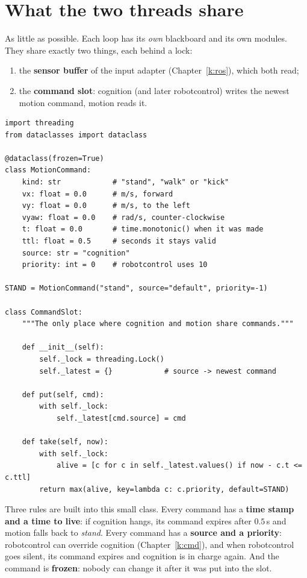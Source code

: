 \section*{What the two threads share}
As little as possible. Each loop has its \emph{own} blackboard and its own modules. They share exactly two things, each behind a lock:
\begin{enumerate}[nosep]
  \item the \textbf{sensor buffer} of the input adapter (Chapter~\ref{k:ros}), which both read;
  \item the \textbf{command slot}: cognition (and later robotcontrol) writes the newest motion command, motion reads it.
\end{enumerate}
\begin{verbatim}
import threading
from dataclasses import dataclass

@dataclass(frozen=True)
class MotionCommand:
    kind: str            # "stand", "walk" or "kick"
    vx: float = 0.0      # m/s, forward
    vy: float = 0.0      # m/s, to the left
    vyaw: float = 0.0    # rad/s, counter-clockwise
    t: float = 0.0       # time.monotonic() when it was made
    ttl: float = 0.5     # seconds it stays valid
    source: str = "cognition"
    priority: int = 0    # robotcontrol uses 10

STAND = MotionCommand("stand", source="default", priority=-1)

class CommandSlot:
    """The only place where cognition and motion share commands."""

    def __init__(self):
        self._lock = threading.Lock()
        self._latest = {}            # source -> newest command

    def put(self, cmd):
        with self._lock:
            self._latest[cmd.source] = cmd

    def take(self, now):
        with self._lock:
            alive = [c for c in self._latest.values() if now - c.t <= c.ttl]
        return max(alive, key=lambda c: c.priority, default=STAND)
\end{verbatim}
Three rules are built into this small class. Every command has a \textbf{time stamp and a time to live}: if cognition hangs, its command expires after $0.5$\,s and motion falls back to \emph{stand}. Every command has a \textbf{source and a priority}: robotcontrol can override cognition (Chapter~\ref{k:cmd}), and when robotcontrol goes silent, its command expires and cognition is in charge again. And the command is \textbf{frozen}: nobody can change it after it was put into the slot.

